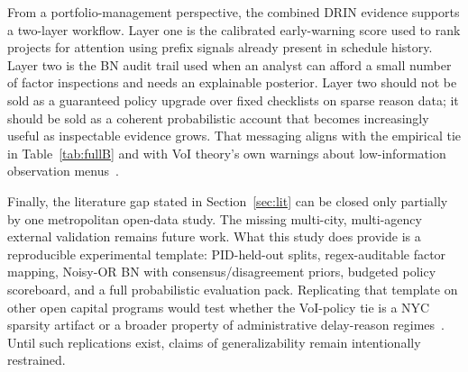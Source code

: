From a portfolio-management perspective, the combined DRIN evidence supports a two-layer workflow. Layer one is the calibrated early-warning score used to rank projects for attention using prefix signals already present in schedule history. Layer two is the BN audit trail used when an analyst can afford a small number of factor inspections and needs an explainable posterior. Layer two should not be sold as a guaranteed policy upgrade over fixed checklists on sparse reason data; it should be sold as a coherent probabilistic account that becomes increasingly useful as inspectable evidence grows. That messaging aligns with the empirical tie in Table~\ref{tab:fullB} and with VoI theory's own warnings about low-information observation menus~\cite{Song2021,Malings2016,Howard1966}.

Finally, the literature gap stated in Section~\ref{sec:lit} can be closed only partially by one metropolitan open-data study. The missing multi-city, multi-agency external validation remains future work. What this study does provide is a reproducible experimental template: PID-held-out splits, regex-auditable factor mapping, Noisy-OR BN with consensus/disagreement priors, budgeted policy scoreboard, and a full probabilistic evaluation pack. Replicating that template on other open capital programs would test whether the VoI-policy tie is a NYC sparsity artifact or a broader property of administrative delay-reason regimes~\cite{Woldesenbet2016,Regona2024,Abioye2021}. Until such replications exist, claims of generalizability remain intentionally restrained.
